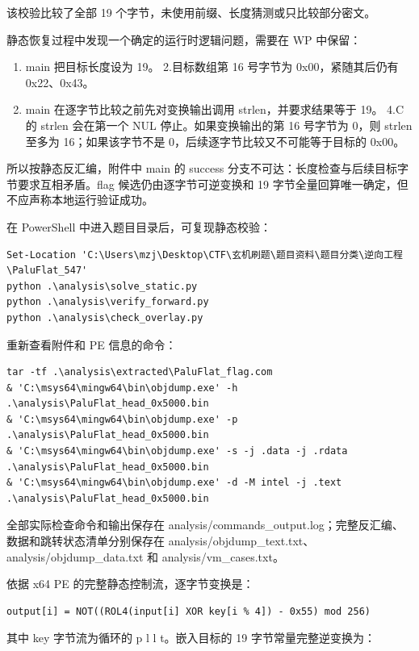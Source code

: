 该校验比较了全部 19 个字节，未使用前缀、长度猜测或只比较部分密文。

静态恢复过程中发现一个确定的运行时逻辑问题，需要在 WP 中保留：

\begin{enumerate}
\def\labelenumi{\arabic{enumi}.}
\tightlist
\item
  main 把目标长度设为 19。 2.目标数组第 16 号字节为 0x00，紧随其后仍有 0x22、0x43。
\item
  main 在逐字节比较之前先对变换输出调用 strlen，并要求结果等于 19。 4.C 的 strlen 会在第一个 NUL 停止。如果变换输出的第 16 号字节为 0，则 strlen 至多为 16；如果该字节不是 0，后续逐字节比较又不可能等于目标的 0x00。
\end{enumerate}

所以按静态反汇编，附件中 main 的 success 分支不可达：长度检查与后续目标字节要求互相矛盾。flag 候选仍由逐字节可逆变换和 19 字节全量回算唯一确定，但不应声称本地运行验证成功。

在 PowerShell 中进入题目目录后，可复现静态校验：

\begin{verbatim}
Set-Location 'C:\Users\mzj\Desktop\CTF\玄机刷题\题目资料\题目分类\逆向工程\PaluFlat_547'
python .\analysis\solve_static.py
python .\analysis\verify_forward.py
python .\analysis\check_overlay.py
\end{verbatim}

重新查看附件和 PE 信息的命令：

\begin{verbatim}
tar -tf .\analysis\extracted\PaluFlat_flag.com
& 'C:\msys64\mingw64\bin\objdump.exe' -h .\analysis\PaluFlat_head_0x5000.bin
& 'C:\msys64\mingw64\bin\objdump.exe' -p .\analysis\PaluFlat_head_0x5000.bin
& 'C:\msys64\mingw64\bin\objdump.exe' -s -j .data -j .rdata .\analysis\PaluFlat_head_0x5000.bin
& 'C:\msys64\mingw64\bin\objdump.exe' -d -M intel -j .text .\analysis\PaluFlat_head_0x5000.bin
\end{verbatim}

全部实际检查命令和输出保存在 analysis/commands\_output.log；完整反汇编、数据和跳转状态清单分别保存在 analysis/objdump\_text.txt、analysis/objdump\_data.txt 和 analysis/vm\_cases.txt。

依据 x64 PE 的完整静态控制流，逐字节变换是：

\begin{verbatim}
output[i] = NOT((ROL4(input[i] XOR key[i % 4]) - 0x55) mod 256)
\end{verbatim}

其中 key 字节流为循环的 p l l t。嵌入目标的 19 字节常量完整逆变换为：

